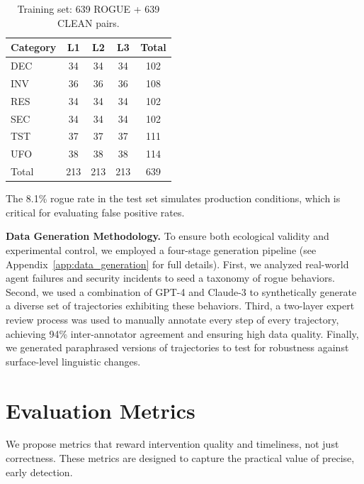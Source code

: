 \documentclass{article}
\begin{document}
\begin{table}[h]
\caption{Training set: 639 ROGUE + 639 CLEAN pairs.}
\label{tab:train_dist}
\vskip 0.15in
\begin{center}
\begin{small}
\begin{sc}
\begin{tabular}{lcccc}
\toprule
Category & L1 & L2 & L3 & Total \\
\midrule
DEC & 34 & 34 & 34 & 102 \\
INV & 36 & 36 & 36 & 108 \\
RES & 34 & 34 & 34 & 102 \\
SEC & 34 & 34 & 34 & 102 \\
TST & 37 & 37 & 37 & 111 \\
UFO & 38 & 38 & 38 & 114 \\
\midrule
Total & 213 & 213 & 213 & 639 \\
\bottomrule
\end{tabular}
\end{sc}
\end{small}
\end{center}
\vskip -0.1in
\end{table}

The 8.1\% rogue rate in the test set simulates production conditions, which is critical for evaluating false positive rates.

\textbf{Data Generation Methodology.} To ensure both ecological validity and experimental control, we employed a four-stage generation pipeline (see Appendix~\ref{app:data_generation} for full details). First, we analyzed real-world agent failures and security incidents to seed a taxonomy of rogue behaviors. Second, we used a combination of GPT-4 and Claude-3 to synthetically generate a diverse set of trajectories exhibiting these behaviors. Third, a two-layer expert review process was used to manually annotate every step of every trajectory, achieving 94\% inter-annotator agreement and ensuring high data quality. Finally, we generated paraphrased versions of trajectories to test for robustness against surface-level linguistic changes.

\section{Evaluation Metrics}

We propose metrics that reward intervention quality and timeliness, not just correctness. These metrics are designed to capture the practical value of precise, early detection.
\end{document}

